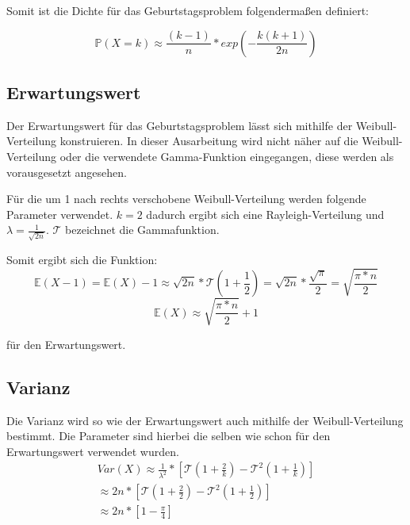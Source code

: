 \documentclass[../main.tex]{subfiles}
\begin{document}
\begin{flushleft}
Somit ist die Dichte für das Geburtstagsproblem folgendermaßen definiert:

\begin{equation}
\mathbb{P}(X = k) \approx \frac{ (k-1) }{ n } * exp( - \frac{ k (k + 1) }{ 2n } )
\end{equation}

 \subsection{Erwartungswert}

Der Erwartungswert für das Geburtstagsproblem lässt sich mithilfe der Weibull-Verteilung konstruieren. In dieser Ausarbeitung wird nicht näher auf die Weibull-Verteilung oder die verwendete Gamma-Funktion eingegangen, diese werden als vorausgesetzt angesehen.  \newline

Für die um 1 nach rechts verschobene Weibull-Verteilung werden folgende Parameter verwendet. $k = 2$ dadurch ergibt sich eine Rayleigh-Verteilung und $\lambda = \frac{ 1 }{ \sqrt{2n} }$. $\mathcal{T}$ bezeichnet die Gammafunktion. \newline

Somit ergibt sich die Funktion:
\begin{equation}
\mathbb{E}(X - 1) = \mathbb{E}(X) - 1 \approx \sqrt{ 2n } * \mathcal{T} (1 + \frac{ 1 }{ 2 } ) = \sqrt{ 2n } * \frac{ \sqrt{ \pi } }{ 2 } = \sqrt{ \frac{ \pi*n }{ 2 } }
\end{equation}
\begin{equation}
\mathbb{E}(X) \approx \sqrt{ \frac{ \pi*n }{ 2 } } + 1
\end{equation}

für den Erwartungswert.

 \subsection{Varianz}

Die Varianz wird so wie der Erwartungswert auch mithilfe der Weibull-Verteilung bestimmt. Die Parameter sind hierbei die selben wie schon für den Erwartungswert verwendet wurden.
\begin{eqnarray}
Var(X) \approx \frac{ 1 }{ \lambda^{ 2 } } * [\mathcal{T}(1+\frac{ 2 }{ k }) - \mathcal{T}^{ 2 }(1+\frac{ 1 }{ k } )]   \label{eq:08}\\
\approx 2n * [\mathcal{T}(1+\frac{ 2 }{ 2 }) - \mathcal{T}^{ 2 }(1+\frac{ 1 }{ 2 } )] \\
\approx 2n * [1 - \frac{ \pi }{ 4 }]
\end{eqnarray}


\end{flushleft}
\end{document}
